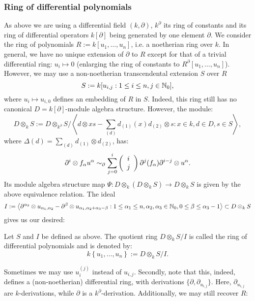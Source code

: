 \subsubsection{Ring of differential polynomials}\label{RingOfDiffPolys}
As above we are using a differential field $(k,\partial)$, $k^\partial$ its ring of constants and its ring of differential operators $k[\partial]$ being generated by one element $\partial$.%
 We consider the ring of polynomials $R := k[u_1,\ldots,u_n]$, i.e. a noetherian ring over $k$. In general, we have no unique extension of $\partial$ to $R$ except for that of a trivial differential ring: $u_i \longmapsto 0$ (enlarging the ring of constants to $R^\partial[u_1,\ldots,u_n]$). However, we may use a non-noetherian transcendental extension $S$ over $R$
$$S := k[u_{i,j} : 1 \leq i \leq n, j \in \nz_0],$$ where $u_{i} \longmapsto u_{i,0}$ defines an embedding of $R$ in $S$. Indeed, this ring still has no canonical $D = k[\partial]$-module algebra structure. However, the module:
$$D \otimes_k S := D \otimes_{k^\partial} S/\left<d \otimes x s - \sum_{(d)} d_{(1)}(x)d_{(2)} \otimes s : x \in k, d \in D, s \in S\right>,$$
where $\Delta(d) = \sum_{(d)} d_{(1)} \otimes d_{(2)}$, has:
$$\partial^i \otimes f_\alpha u^\alpha \sim_\partial \sum_{j=0}^i\left(\bao{c}i\\j\\\ea\right) \partial^j(f_\alpha) \partial^{i-j}\otimes u^\alpha.$$
Its module algebra structure map $\Psi : D \otimes_k (D \otimes_k S) \longrightarrow D \otimes_k S$ is given by the above equivalence relation. The ideal
$$I := \left<\partial^{\alpha_3} \otimes u_{\alpha_1,\alpha_2} - \partial^\beta \otimes u_{\alpha_1,\alpha_2 + \alpha_3 - \beta} : 1 \leq \alpha_1 \leq n, \alpha_2, \alpha_3 \in \nz_0, 0 \leq \beta \leq \alpha_3 - 1\right> \subset D \otimes_k S$$ gives us our desired:
\begin{defi}
Let $S$ and $I$ be defined as above. The quotient ring $D \otimes_k S/I$ is called the ring of differential polynomials and is denoted by:
$$k\left\{u_1,\ldots,u_n\right\} := D \otimes_k S/I.$$
\end{defi}
\bmk %
Sometimes we may use $u_i^{(j)}$ instead of $u_{i,j}$. Secondly, note that this, indeed, defines a (non-noetherian) differential ring, with derivations $\{\partial, \partial_{u_{i,j}}\}$. Here, $\partial_{u_{i,j}}$ are $k$-derivations, while $\partial$ is a $k^\partial$-derivation. Additionally, we may still recover $R$:
